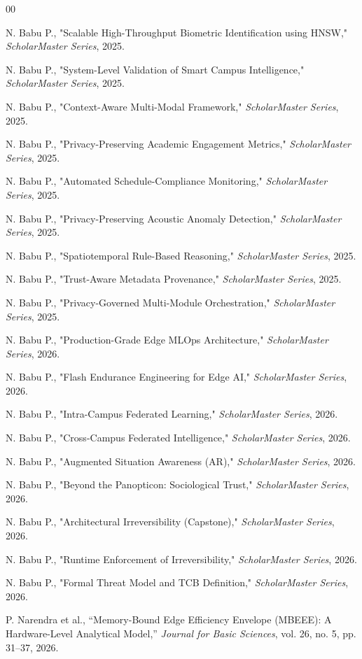 \documentclass[conference]{IEEEtran}
\theoremstyle{definition}
\begin{document}
\begin{thebibliography}{00}

 N. Babu P., "Scalable High-Throughput Biometric Identification using HNSW," \textit{ScholarMaster Series}, 2025.

 N. Babu P., "System-Level Validation of Smart Campus Intelligence," \textit{ScholarMaster Series}, 2025.


 N. Babu P., "Context-Aware Multi-Modal Framework," \textit{ScholarMaster Series}, 2025.

 N. Babu P., "Privacy-Preserving Academic Engagement Metrics," \textit{ScholarMaster Series}, 2025.

 N. Babu P., "Automated Schedule-Compliance Monitoring," \textit{ScholarMaster Series}, 2025.

 N. Babu P., "Privacy-Preserving Acoustic Anomaly Detection," \textit{ScholarMaster Series}, 2025.

 N. Babu P., "Spatiotemporal Rule-Based Reasoning," \textit{ScholarMaster Series}, 2025.

 N. Babu P., "Trust-Aware Metadata Provenance," \textit{ScholarMaster Series}, 2025.

 N. Babu P., "Privacy-Governed Multi-Module Orchestration," \textit{ScholarMaster Series}, 2025.

 N. Babu P., "Production-Grade Edge MLOps Architecture," \textit{ScholarMaster Series}, 2026.

 N. Babu P., "Flash Endurance Engineering for Edge AI," \textit{ScholarMaster Series}, 2026.

 N. Babu P., "Intra-Campus Federated Learning," \textit{ScholarMaster Series}, 2026.

 N. Babu P., "Cross-Campus Federated Intelligence," \textit{ScholarMaster Series}, 2026.

 N. Babu P., "Augmented Situation Awareness (AR)," \textit{ScholarMaster Series}, 2026.

 N. Babu P., "Beyond the Panopticon: Sociological Trust," \textit{ScholarMaster Series}, 2026.

 N. Babu P., "Architectural Irreversibility (Capstone)," \textit{ScholarMaster Series}, 2026.

 N. Babu P., "Runtime Enforcement of Irreversibility," \textit{ScholarMaster Series}, 2026.

 N. Babu P., "Formal Threat Model and TCB Definition," \textit{ScholarMaster Series}, 2026.

 P. Narendra et al., ``Memory-Bound Edge Efficiency Envelope (MBEEE): A Hardware-Level Analytical Model,'' \textit{Journal for Basic Sciences}, vol. 26, no. 5, pp. 31--37, 2026.

\end{thebibliography}
\end{document}

